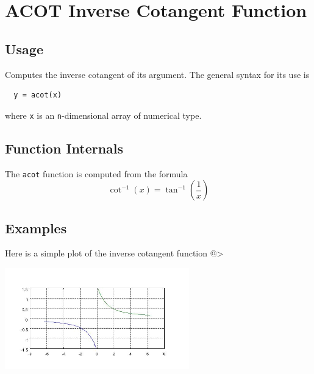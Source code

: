 \section{ACOT Inverse Cotangent Function}

\subsection{Usage}

Computes the inverse cotangent of its argument.  The general
syntax for its use is
\begin{verbatim}
  y = acot(x)
\end{verbatim}
where \verb|x| is an \verb|n|-dimensional array of numerical type.
\subsection{Function Internals}

The \verb|acot| function is computed from the formula
\[
   \cot^{-1}(x) = \tan^{-1}\left(\frac{1}{x}\right)
\]
\subsection{Examples}

Here is a simple plot of the inverse cotangent function
@>


\centerline{\includegraphics[width=8cm]{acotplot}}

